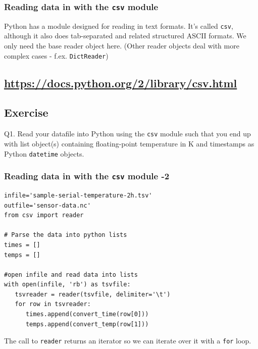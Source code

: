 \documentclass[aspectratio=1610,9pt]{beamer} %
\begin{document}
\begin{frame}
\frametitle{Reading data in with the \texttt{csv}
module}

Python has a module designed for reading in text formats. It's called
\texttt{csv}, although it also does tab-separated and related structured
ASCII formats. We only need the base reader object here. (Other reader
objects deal with more complex cases - f.ex. \texttt{DictReader})

\subsection{\href{https://docs.python.org/2/library/csv.html}{https://docs.python.org/2/library/csv.html}}

\subsection{Exercise}

Q1. Read your datafile into Python using the \texttt{csv} module such
that you end up with list object(s) containing floating-point
temperature in K and timestamps as Python \texttt{datetime} objects.

\end{frame}
\begin{frame}[fragile]
\frametitle{Reading data in with the \texttt{csv} module
-2}

\begin{verbatim}
infile='sample-serial-temperature-2h.tsv'
outfile='sensor-data.nc'
from csv import reader

# Parse the data into python lists
times = []
temps = []

#open infile and read data into lists
with open(infile, 'rb') as tsvfile:
   tsvreader = reader(tsvfile, delimiter='\t')
   for row in tsvreader:
      times.append(convert_time(row[0]))
      temps.append(convert_temp(row[1]))
\end{verbatim}

The call to \texttt{reader} returns an iterator so we can iterate over
it with a \texttt{for} loop.

\end{frame}
\end{document}

